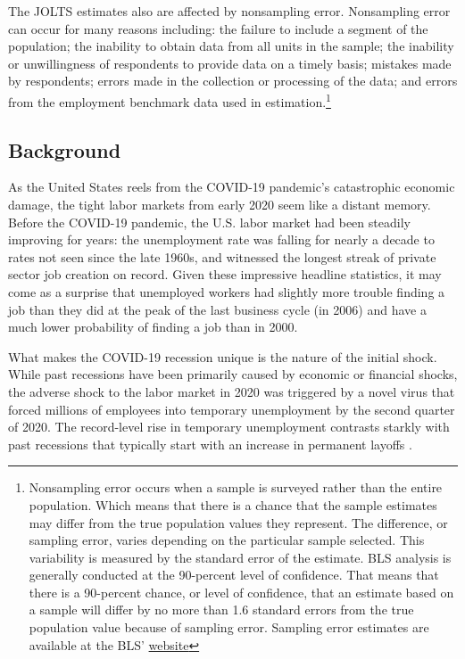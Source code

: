\documentclass[
  11pt,
]{article}
\begin{document}
The JOLTS estimates also are affected by nonsampling error. Nonsampling
error can occur for many reasons including: the failure to include a
segment of the population; the inability to obtain data from all units
in the sample; the inability or unwillingness of respondents to provide
data on a timely basis; mistakes made by respondents; errors made in the
collection or processing of the data; and errors from the employment
benchmark data used in estimation.\footnote{Nonsampling error occurs
  when a sample is surveyed rather than the entire population. Which
  means that there is a chance that the sample estimates may differ from
  the true population values they represent. The difference, or sampling
  error, varies depending on the particular sample selected. This
  variability is measured by the standard error of the estimate. BLS
  analysis is generally conducted at the 90-percent level of confidence.
  That means that there is a 90-percent chance, or level of confidence,
  that an estimate based on a sample will differ by no more than 1.6
  standard errors from the true population value because of sampling
  error. Sampling error estimates are available at the BLS'
  \href{https://www.bls.gov/jlt/jolts_median_standard_errors.htm}{website}}

\hypertarget{background}{%
\subsection{Background}\label{background}}

As the United States reels from the COVID-19 pandemic's catastrophic
economic damage, the tight labor markets from early 2020 seem like a
distant memory. Before the COVID-19 pandemic, the U.S. labor market had
been steadily improving for years: the unemployment rate was falling for
nearly a decade to rates not seen since the late 1960s, and witnessed
the longest streak of private sector job creation on record. Given these
impressive headline statistics, it may come as a surprise that
unemployed workers had slightly more trouble finding a job than they did
at the peak of the last business cycle (in 2006) and have a much lower
probability of finding a job than in 2000.

What makes the COVID-19 recession unique is the nature of the initial
shock. While past recessions have been primarily caused by economic or
financial shocks, the adverse shock to the labor market in 2020 was
triggered by a novel virus that forced millions of employees into
temporary unemployment by the second quarter of 2020. The record-level
rise in temporary unemployment contrasts starkly with past recessions
that typically start with an increase in permanent layoffs
\citep{elsby10}.
\end{document}
